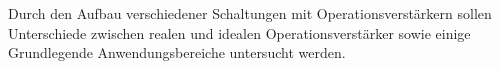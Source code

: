 Durch den Aufbau verschiedener Schaltungen mit Operationsverstärkern sollen
Unterschiede zwischen realen und idealen Operationsverstärker sowie einige
Grundlegende Anwendungsbereiche untersucht werden.
